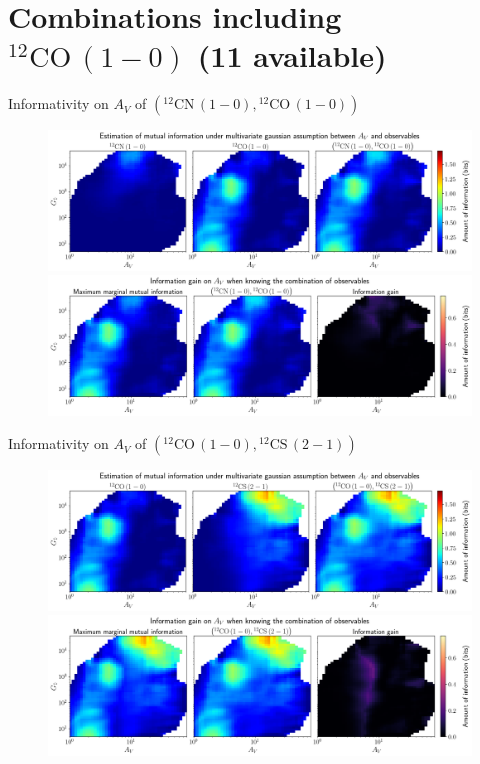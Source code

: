 \documentclass{beamer}
\begin{document}
\section{Combinations including $\mathrm{^{12}CO\,(1-0)}$ (11 available)}

\begin{frame}{Informativity on $A_V$ of $\left(\mathrm{^{12}CN\,(1-0)},\mathrm{^{12}CO\,(1-0)}\right)$}
    \begin{figure}
        \centering
        \includegraphics[width=0.95\linewidth]{../linearinfo/av__12cn10_12co10_linearinfo.png}
        \vfill
        \includegraphics[width=0.95\linewidth]{../linearinfo/av__12cn10_12co10_linearinfo_gain.png}
    \end{figure}
\end{frame}

\begin{frame}{Informativity on $A_V$ of $\left(\mathrm{^{12}CO\,(1-0)},\mathrm{^{12}CS\,(2-1)}\right)$}
    \begin{figure}
        \centering
        \includegraphics[width=0.95\linewidth]{../linearinfo/av__12co10_12cs21_linearinfo.png}
        \vfill
        \includegraphics[width=0.95\linewidth]{../linearinfo/av__12co10_12cs21_linearinfo_gain.png}
    \end{figure}
\end{frame}
\end{document}
